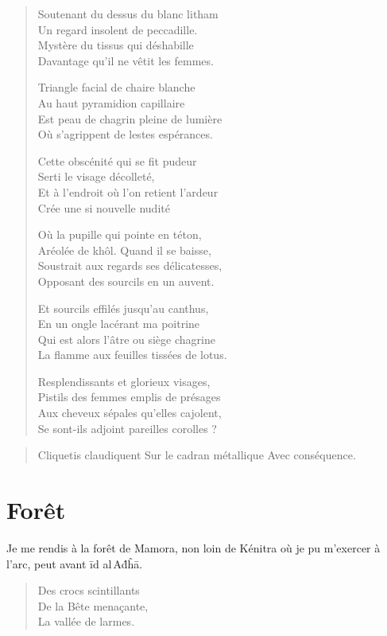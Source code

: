\begin{verse}
Soutenant du dessus du blanc litham\label{foot.litham}\\
Un regard insolent de peccadille.\\
Mystère du tissus qui déshabille\\
Davantage qu’il ne vêtit les femmes.

Triangle facial de chaire blanche\\
Au haut pyramidion capillaire\\
Est peau de chagrin pleine de lumière\\
Où s’agrippent de lestes espérances.

Cette obscénité qui se fit pudeur\\
Serti le visage décolleté,\\
Et à l’endroit où l’on retient l’ardeur\\
Crée une si nouvelle nudité

Où la pupille qui pointe en téton,\\
Aréolée de khôl. Quand il se baisse,\\
Soustrait aux regards ses délicatesses,\\
Opposant des sourcils en un auvent.

Et sourcils effilés jusqu’au canthus,\\
En un ongle lacérant ma poitrine\\
Qui est alors l’âtre ou siège chagrine\\
La flamme aux feuilles tissées de lotus.

Resplendissants et glorieux visages,\\
Pistils des femmes emplis de présages\\
Aux cheveux sépales qu’elles cajolent,\\
Se sont-ils adjoint pareilles corolles ?
\end{verse}
\afterpage{}

\begin{verse}
Cliquetis claudiquent
Sur le cadran métallique
Avec conséquence.
\end{verse}

\section*{Forêt}
\begin{prose}
Je me rendis à la forêt de Mamora, non loin de Kénitra où je pu m’exercer à l’arc, peut avant īd al\,Aḋĥā.
\end{prose}
\begin{verse}
Des crocs scintillants\\
De la Bête menaçante,\\
La vallée de larmes.
\end{verse}

